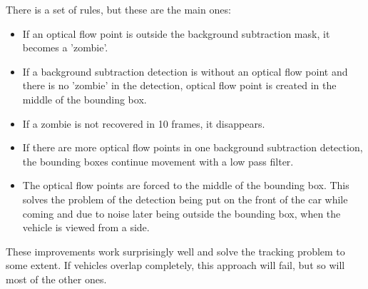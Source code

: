 \documentclass[a4paper,12pt,titlepage, twoside]{article}
\numberwithin{figure}{section}
\begin{document}
There is a set of rules, but these are the main ones:
\begin{itemize}
	\item If an optical flow point is outside the background subtraction mask, it becomes a 'zombie'.
	\item If a background subtraction detection is without an optical flow point and there is no 'zombie' in the detection, optical flow point is created in the middle of the bounding box. 
	\item If a zombie is not recovered in 10 frames, it disappears. 
	\item If there are more optical flow points in one background subtraction detection, the bounding boxes continue movement with a low pass filter.
	\item The optical flow points are forced to the middle of the bounding box. This solves the problem of the detection being put on the front of the car while coming and due to noise later being outside the bounding box, when the vehicle is viewed from a side.
\end{itemize}

These improvements work surprisingly well and solve the tracking problem to some extent. If vehicles overlap completely, this approach will fail, but so will most of the other ones. 










{}
\cleardoublepage
\clearpage
\end{document}
